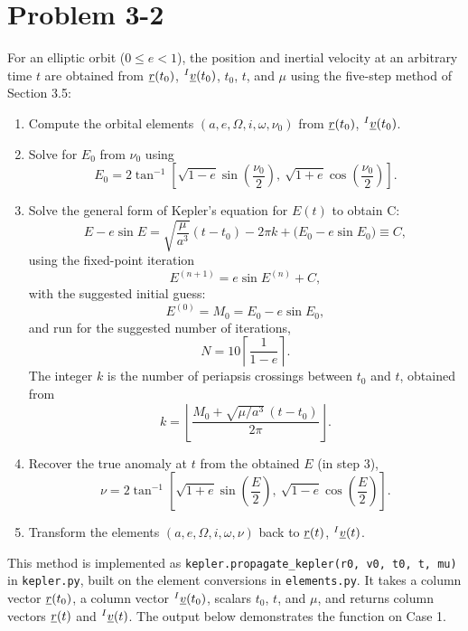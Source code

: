 \section{Problem 3-2}
\label{sec:problem2}

For an elliptic orbit ($0 \le e < 1$), the position and inertial velocity at an arbitrary time $t$ are obtained from $\underline{r}(t_0)$, ${}^{I}\underline{v}(t_0)$, $t_0$, $t$, and $\mu$ using the five-step method of Section 3.5:
\begin{enumerate}
    \item Compute the orbital elements $(a, e, \Omega, i, \omega, \nu_0)$ from $\underline{r}(t_0)$, ${}^{I}\underline{v}(t_0)$.
    \item Solve for $E_0$ from $\nu_0$ using
    \begin{equation}
        E_0 = 2\tan^{-1}\!\left[\sqrt{1-e}\sin\!\left(\frac{\nu_0}{2}\right),\ \sqrt{1+e}\cos\!\left(\frac{\nu_0}{2}\right)\right].
    \end{equation}
    \item Solve the general form of Kepler's equation for $E(t)$ to obtain C:
    \begin{equation}
        E - e\sin E = \sqrt{\frac{\mu}{a^3}}(t-t_0) - 2\pi k + \big(E_0 - e\sin E_0\big) \equiv C,
    \end{equation}
    using the fixed-point iteration
    \begin{equation}
        E^{(n+1)} = e\sin E^{(n)} + C,
    \end{equation}
    with the suggested initial guess:
    \begin{equation}
        E^{(0)} = M_0 = E_0 - e\sin E_0,
    \end{equation}
    and run for the suggested number of iterations,
    \begin{equation}
        N = 10\left\lceil \frac{1}{1-e} \right\rceil.
    \end{equation}
    The integer $k$ is the number of periapsis crossings between $t_0$ and $t$, obtained from
    \begin{equation}
        k = \left\lfloor \frac{M_0 + \sqrt{\mu/a^3}\,(t-t_0)}{2\pi} \right\rfloor.
    \end{equation}
    \item Recover the true anomaly at $t$ from the obtained $E$ (in step 3),
    \begin{equation}
        \nu = 2\tan^{-1}\!\left[\sqrt{1+e}\sin\!\left(\frac{E}{2}\right),\ \sqrt{1-e}\cos\!\left(\frac{E}{2}\right)\right].
    \end{equation}
    \item Transform the elements $(a, e, \Omega, i, \omega, \nu)$ back to $\underline{r}(t)$, ${}^{I}\underline{v}(t)$.
\end{enumerate}

This method is implemented as \texttt{kepler.propagate\_kepler(r0, v0, t0, t, mu)} in \texttt{kepler.py}, built on the element conversions in \texttt{elements.py}. It takes a column vector $\underline{r}(t_0)$, a column vector ${}^{I}\underline{v}(t_0)$, scalars $t_0$, $t$, and $\mu$, and returns column vectors $\underline{r}(t)$ and ${}^{I}\underline{v}(t)$. The output below demonstrates the function on Case 1.


\FloatBarrier
